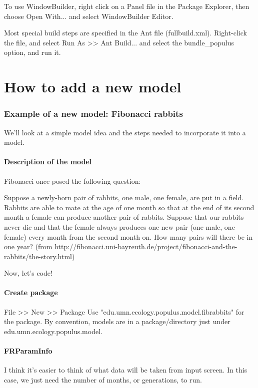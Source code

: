 \documentclass[12pt]{article}
\begin{document}
To use WindowBuilder, right click on a Panel file in the Package Explorer, then choose Open With... and select WindowBuilder Editor.


Most special build steps are specified in the Ant file (fullbuild.xml). Right-click the file, and select Run As >> Ant Build... and select the bundle_populus option, and run it.

\part{How to add a new model}
\section{Example of a new model: Fibonacci rabbits}

We'll look at a simple model idea and the steps needed to incorporate it into a model.

\subsection{Description of the model}
Fibonacci once posed the following question:

Suppose a newly-born pair of rabbits, one male, one female, are put in a field. Rabbits are able to mate at the age of one month so that at the end of its second month a female can produce another pair of rabbits. Suppose that our rabbits never die and that the female always produces one new pair (one male, one female) every month from the second month on. How many pairs will there be in one year?  (from http://fibonacci.uni-bayreuth.de/project/fibonacci-and-the-rabbits/the-story.html)

Now, let's code!

\subsection{Create package}
File >> New >> Package
Use "edu.umn.ecology.populus.model.fibrabbits" for the package.  By convention, models are in a package/directory just under edu.umn.ecology.populus.model.

\subsection{FRParamInfo}
I think it's easier to think of what data will be taken from input screen.  In this case, we just need the number of months, or generations, to run.
\end{document}
